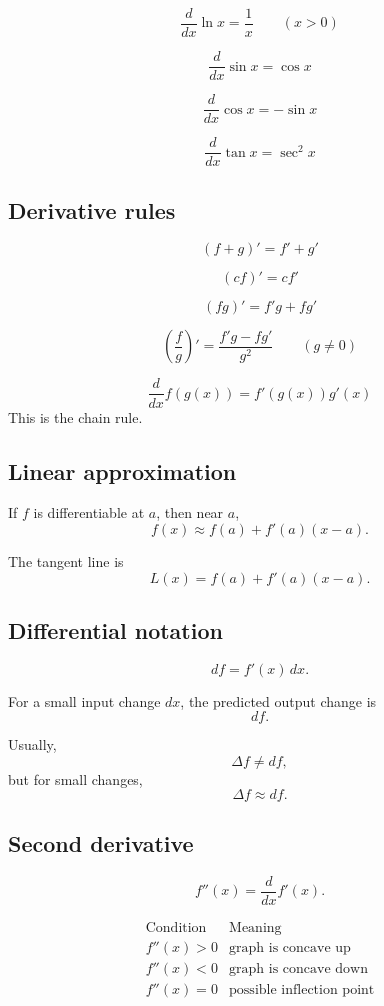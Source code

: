 \[
\frac{d}{dx}\ln x=\frac1x
\qquad (x>0)
\]

\[
\frac{d}{dx}\sin x=\cos x
\]

\[
\frac{d}{dx}\cos x=-\sin x
\]

\[
\frac{d}{dx}\tan x=\sec^2x
\]

\subsection*{Derivative rules}

\[
\boxed{
    (f+g)'=f'+g'
}
\]

\[
\boxed{
    (cf)'=cf'
}
\]

\[
\boxed{
    (fg)'=f'g+fg'
}
\]

\[
\boxed{
    \left(\frac{f}{g}\right)'
    =
    \frac{f'g-fg'}{g^2}
    \qquad (g\ne0)
}
\]

\[
\boxed{
    \frac{d}{dx}f(g(x))=f'(g(x))g'(x)
}
\]
This is the chain rule.

\subsection*{Linear approximation}

If \(f\) is differentiable at \(a\), then near \(a\),
\[
\boxed{
    f(x)\approx f(a)+f'(a)(x-a).
}
\]

The tangent line is
\[
\boxed{
    L(x)=f(a)+f'(a)(x-a).
}
\]

\subsection*{Differential notation}

\[
\boxed{
    df=f'(x)\,dx.
}
\]

For a small input change \(dx\), the predicted output change is
\[
    df.
\]

Usually,
\[
    \Delta f\ne df,
\]
but for small changes,
\[
    \Delta f\approx df.
\]

\subsection*{Second derivative}

\[
    f''(x)=\frac{d}{dx}f'(x).
\]

\[
\begin{array}{c|c}
\text{Condition} & \text{Meaning} \\ \hline
f''(x)>0 & \text{graph is concave up}\\
f''(x)<0 & \text{graph is concave down}\\
f''(x)=0 & \text{possible inflection point}
\end{array}
\]


